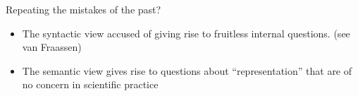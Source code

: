 \documentclass[8pt]{beamer}
\begin{document}
\begin{frame}{Repeating the mistakes of the past?}

\begin{itemize}
\item The syntactic view accused of giving rise to fruitless internal
  questions.  (see van Fraassen)
\item The semantic view gives rise to questions about
  ``representation'' that are of no concern in scientific practice
\end{itemize}
\end{frame}








\end{document}
